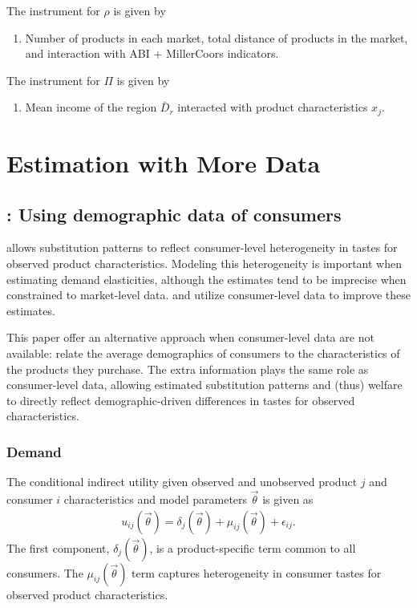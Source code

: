 \documentclass[11pt]{elegantbook}
\begin{document}
The instrument for $\rho$ is given by
\begin{enumerate}[$\circ$]
    \item Number of products in each market, total distance of products in the market, and interaction with ABI + MillerCoors indicators.
\end{enumerate}
The instrument for $\Pi$ is given by
\begin{enumerate}[$\circ$]
    \item Mean income of the region $\bar{D}_r$ interacted with product characteristics $x_j$.
\end{enumerate}



\chapter{Estimation with More Data}
\section{\cite{petrin2002quantifying}: Using demographic data of consumers}
\cite{berry1995automobile} allows substitution patterns to reflect consumer-level heterogeneity in tastes for observed product characteristics. Modeling this heterogeneity is important when estimating demand elasticities, although the estimates tend to be imprecise when constrained to market-level data. \cite{goldberg1995product} and \cite{berry2004differentiated} utilize consumer-level data to improve these estimates.

This paper offer an alternative approach when consumer-level data are not available: relate the average demographics of consumers to the characteristics of the products they purchase. The extra information plays the same role as consumer-level data, allowing estimated substitution patterns and (thus) welfare to directly reflect demographic-driven differences in tastes for observed characteristics.


\subsection{Demand}
The conditional indirect utility given observed and unobserved product $j$ and consumer $i$ characteristics and model parameters $\vec{\theta}$ is given as
\begin{equation}
    \begin{aligned}
        u_{ij}(\vec{\theta})=\delta_j(\vec{\theta})+\mu_{ij}(\vec{\theta})+\epsilon_{ij}.
    \end{aligned}
    \nonumber
\end{equation}
The first component, $\delta_j(\vec{\theta})$, is a product-specific term common to all consumers. The $\mu_{ij}(\vec{\theta})$ term captures heterogeneity in consumer tastes for observed product characteristics.
\end{document}
